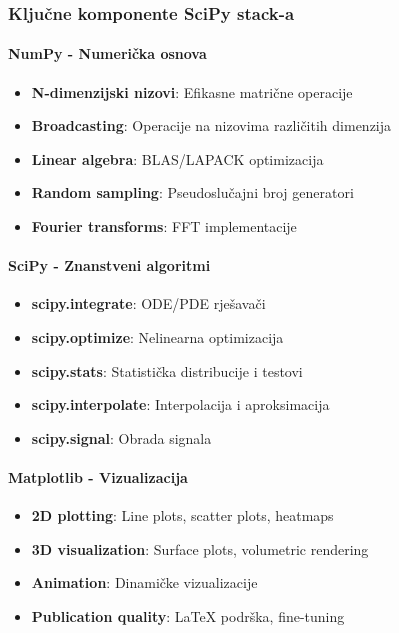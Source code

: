 \documentclass[11pt,oneside]{book}
\begin{document}
\subsubsection{Ključne komponente SciPy stack-a}

\paragraph{NumPy - Numerička osnova}

\begin{itemize}
	\item \textbf{N-dimenzijski nizovi}: Efikasne matrične operacije
	\item \textbf{Broadcasting}: Operacije na nizovima različitih dimenzija
	\item \textbf{Linear algebra}: BLAS/LAPACK optimizacija
	\item \textbf{Random sampling}: Pseudoslučajni broj generatori
	\item \textbf{Fourier transforms}: FFT implementacije
\end{itemize}

\paragraph{SciPy - Znanstveni algoritmi}

\begin{itemize}
	\item \textbf{scipy.integrate}: ODE/PDE rješavači
	\item \textbf{scipy.optimize}: Nelinearna optimizacija
	\item \textbf{scipy.stats}: Statistička distribucije i testovi
	\item \textbf{scipy.interpolate}: Interpolacija i aproksimacija
	\item \textbf{scipy.signal}: Obrada signala
\end{itemize}

\paragraph{Matplotlib - Vizualizacija}

\begin{itemize}
	\item \textbf{2D plotting}: Line plots, scatter plots, heatmaps
	\item \textbf{3D visualization}: Surface plots, volumetric rendering
	\item \textbf{Animation}: Dinamičke vizualizacije
	\item \textbf{Publication quality}: LaTeX podrška, fine-tuning
\end{itemize}
\end{document}
